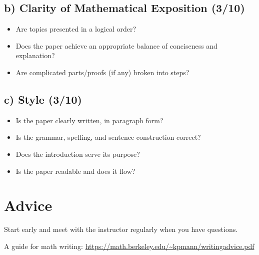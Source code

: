 \documentclass[12pt]{amsart}
\begin{document}
\subsection*{b) Clarity of Mathematical Exposition (3/10)}
\begin{itemize}
	\item Are topics presented in a logical order?
	\item Does the paper achieve an appropriate balance of conciseness and explanation?
	\item Are complicated parts/proofs (if any) broken into steps?
\end{itemize}

\subsection*{c) Style (3/10)}
\begin{itemize}
	\item Is the paper clearly written, in paragraph form?
	\item Is the grammar, spelling, and sentence construction correct?
	\item Does the introduction serve its purpose?
	\item Is the paper readable and does it flow?
\end{itemize}


\section{Advice}
Start early and meet with the instructor regularly when you have questions.

A guide for math writing:
\url{https://math.berkeley.edu/~kpmann/writingadvice.pdf}

\printbibliography
%
%
\end{document}
